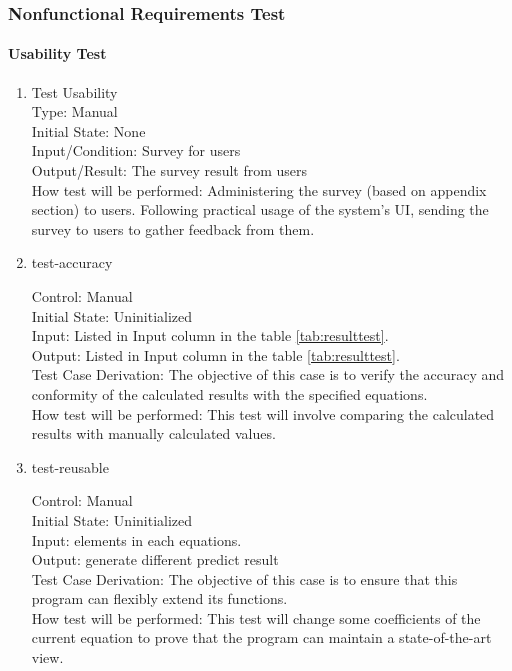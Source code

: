 \documentclass[12pt, titlepage]{article}
\begin{document}
\subsubsection{Nonfunctional Requirements Test}
		
\paragraph{Usability Test}

\begin{enumerate}

\item Test Usability \\
Type: Manual \\
Initial State: None \\
Input/Condition: Survey for users \\
Output/Result: The survey result from users \\
How test will be performed: Administering the survey (based on appendix section) to users. Following practical usage of the system's UI, sending the survey to users to gather feedback from them.

\item{test-accuracy\\}

    Control: Manual	\\				
    Initial State: Uninitialized\\		
    Input: Listed in Input column in the table \ref{tab:resulttest}.\\			
    Output: Listed in Input column in the table \ref{tab:resulttest}.\\
    Test Case Derivation: The objective of this case is to verify the accuracy and conformity of the calculated results with the specified equations.\\
    How test will be performed: This test will involve comparing the calculated results with manually calculated values.\\

\item{test-reusable\\}

    Control: Manual	\\				
    Initial State: Uninitialized\\		
    Input: elements in each equations.\\			
    Output: generate different predict result\\
    Test Case Derivation: The objective of this case is to ensure that this program can flexibly extend its functions.\\
    How test will be performed: This test will change some coefficients of the current equation to prove that the program can maintain a state-of-the-art view.\\
\end{enumerate}
\end{document}
